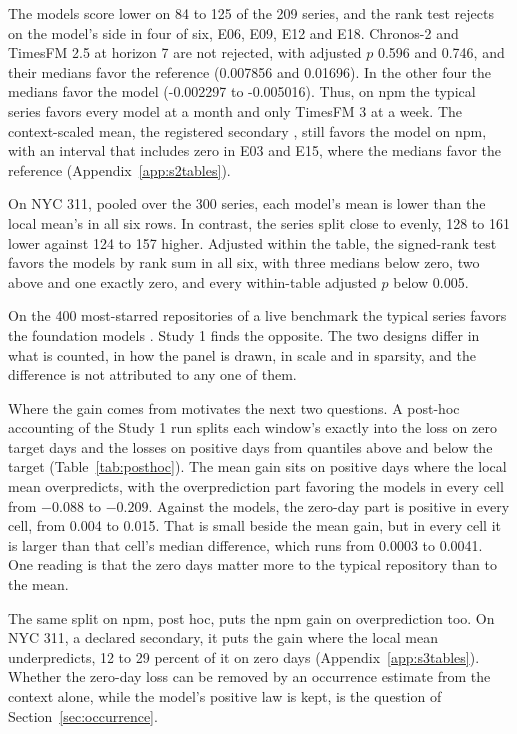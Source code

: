 The models score lower on 84 to 125 of the 209 series, and the rank test rejects on the model's side in four
of six, E06, E09, E12 and E18. Chronos-2 and TimesFM 2.5 at horizon 7 are not rejected, with adjusted $p$
0.596 and 0.746, and their medians favor the reference (0.007856 and 0.01696). In the other four the medians
favor the model (-0.002297 to -0.005016). Thus, on npm the typical series favors every model at a month and
only TimesFM 3 at a week. The context-scaled mean, the registered secondary \citep{corani2026}, still favors
the model on npm, with an interval that includes zero in E03 and E15, where the medians favor the reference
(Appendix~\ref{app:s2tables}).

On NYC 311, pooled over the 300 series, each model's mean is lower than the local mean's in all six rows. In
contrast, the series split close to evenly, 128 to 161 lower against 124 to 157 higher. Adjusted within the
table, the signed-rank test favors the models by rank sum in all six, with three medians below zero, two above
and one exactly zero, and every within-table adjusted $p$ below 0.005.

On the 400 most-starred repositories of a live benchmark the typical series favors the foundation models
\citep{garza2026}. Study 1 finds the opposite. The two designs differ in what is counted, in how the panel is
drawn, in scale and in sparsity, and the difference is not attributed to any one of them.

Where the gain comes from motivates the next two questions. A post-hoc accounting of the Study 1 run splits
each window's \qs{} exactly into the loss on zero target days and the losses on positive days from quantiles
above and below the target (Table~\ref{tab:posthoc}). The mean gain sits on positive days where the local mean
overpredicts, with the overprediction part favoring the models in every cell from $-0.088$ to $-0.209$.
Against the models, the zero-day part is positive in every cell, from 0.004 to 0.015. That is small beside the
mean gain, but in every cell it is larger than that cell's median difference, which runs from 0.0003 to
0.0041. One reading is that the zero days matter more to the typical repository than to the mean.

The same split on npm, post hoc, puts the npm gain on overprediction too. On NYC 311, a declared secondary, it
puts the gain where the local mean underpredicts, 12 to 29 percent of it on zero days
(Appendix~\ref{app:s3tables}). Whether the zero-day loss can be removed by an occurrence estimate from the
context alone, while the model's positive law is kept, is the question of Section~\ref{sec:occurrence}.
